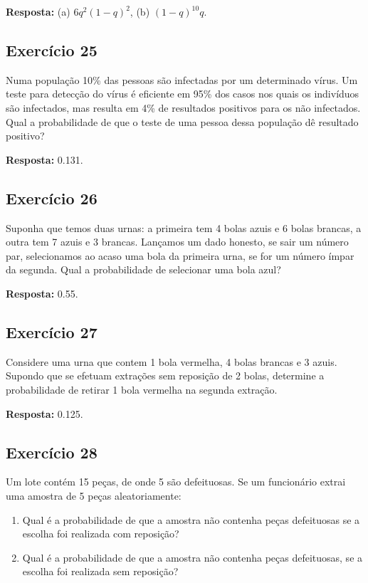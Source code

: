 \documentclass[
  letterpaper,
  DIV=11,
  numbers=noendperiod]{scrartcl}
\begin{document}
\textbf{Resposta:} (a) \(6q^2(1 - q)^2\), (b) \((1 - q)^{10}q\).

\hypertarget{exercuxedcio-25}{%
\subsection{Exercício 25}\label{exercuxedcio-25}}

Numa população 10\% das pessoas são infectadas por um determinado vírus.
Um teste para detecção do vírus é eficiente em 95\% dos casos nos quais
os indivíduos são infectados, mas resulta em 4\% de resultados positivos
para os não infectados. Qual a probabilidade de que o teste de uma
pessoa dessa população dê resultado positivo?

\textbf{Resposta:} 0.131.

\hypertarget{exercuxedcio-26}{%
\subsection{Exercício 26}\label{exercuxedcio-26}}

Suponha que temos duas urnas: a primeira tem 4 bolas azuis e 6 bolas
brancas, a outra tem 7 azuis e 3 brancas. Lançamos um dado honesto, se
sair um número par, selecionamos ao acaso uma bola da primeira urna, se
for um número ímpar da segunda. Qual a probabilidade de selecionar uma
bola azul?

\textbf{Resposta:} 0.55.

\hypertarget{exercuxedcio-27}{%
\subsection{Exercício 27}\label{exercuxedcio-27}}

Considere uma urna que contem 1 bola vermelha, 4 bolas brancas e 3
azuis. Supondo que se efetuam extrações sem reposição de 2 bolas,
determine a probabilidade de retirar 1 bola vermelha na segunda
extração.

\textbf{Resposta:} 0.125.

\hypertarget{exercuxedcio-28}{%
\subsection{Exercício 28}\label{exercuxedcio-28}}

Um lote contém 15 peças, de onde 5 são defeituosas. Se um funcionário
extrai uma amostra de 5 peças aleatoriamente:

\begin{enumerate}
\def\labelenumi{(\alph{enumi})}
\item
  Qual é a probabilidade de que a amostra não contenha peças defeituosas
  se a escolha foi realizada com reposição?
\item
  Qual é a probabilidade de que a amostra não contenha peças
  defeituosas, se a escolha foi realizada sem reposição?
\end{enumerate}
\end{document}
